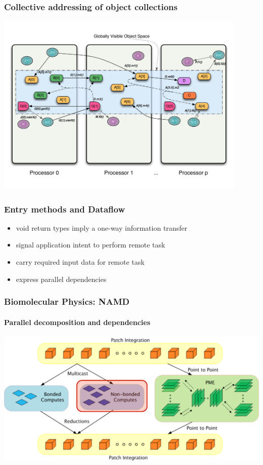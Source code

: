 \begin{frame}
\frametitle{Collective addressing of object collections}
	\begin{center}
        \includegraphics[width=0.9\textwidth]{../figures/progmodel/14-rmi-collective.pdf}
	\end{center}
\end{frame}


\begin{frame}
\frametitle{Entry methods and Dataflow}
    \begin{itemize}[<+->]
        \item void return types imply a one-way information transfer
        \item signal application intent to perform remote task
        \item carry required input data for remote task
        \item express parallel dependencies
    \end{itemize}
\end{frame}


\begin{frame}
\frametitle{Biomolecular Physics: NAMD}
\framesubtitle{Parallel decomposition and dependencies}
\includegraphics[width=\textwidth]{../figures/md_parallelize.pdf}
\end{frame}


